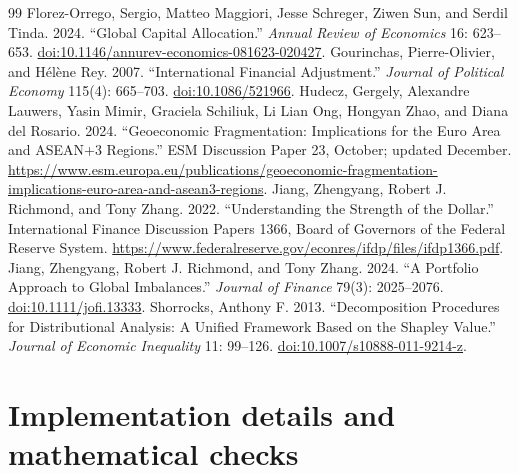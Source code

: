 \documentclass[11pt,a4paper]{article}
\begin{document}
\begin{thebibliography}{99}
 Florez-Orrego, Sergio, Matteo Maggiori, Jesse Schreger, Ziwen Sun, and Serdil Tinda. 2024. ``Global Capital Allocation.'' \textit{Annual Review of Economics} 16: 623--653. \href{https://doi.org/10.1146/annurev-economics-081623-020427}{doi:10.1146/annurev-economics-081623-020427}.
 Gourinchas, Pierre-Olivier, and H\'el\`ene Rey. 2007. ``International Financial Adjustment.'' \textit{Journal of Political Economy} 115(4): 665--703. \href{https://doi.org/10.1086/521966}{doi:10.1086/521966}.
 Hudecz, Gergely, Alexandre Lauwers, Yasin Mimir, Graciela Schiliuk, Li Lian Ong, Hongyan Zhao, and Diana del Rosario. 2024. ``Geoeconomic Fragmentation: Implications for the Euro Area and ASEAN+3 Regions.'' ESM Discussion Paper 23, October; updated December. \url{https://www.esm.europa.eu/publications/geoeconomic-fragmentation-implications-euro-area-and-asean3-regions}.
 Jiang, Zhengyang, Robert J. Richmond, and Tony Zhang. 2022. ``Understanding the Strength of the Dollar.'' International Finance Discussion Papers 1366, Board of Governors of the Federal Reserve System. \url{https://www.federalreserve.gov/econres/ifdp/files/ifdp1366.pdf}.
 Jiang, Zhengyang, Robert J. Richmond, and Tony Zhang. 2024. ``A Portfolio Approach to Global Imbalances.'' \textit{Journal of Finance} 79(3): 2025--2076. \href{https://doi.org/10.1111/jofi.13333}{doi:10.1111/jofi.13333}.
 Shorrocks, Anthony F. 2013. ``Decomposition Procedures for Distributional Analysis: A Unified Framework Based on the Shapley Value.'' \textit{Journal of Economic Inequality} 11: 99--126. \href{https://doi.org/10.1007/s10888-011-9214-z}{doi:10.1007/s10888-011-9214-z}.
\end{thebibliography}

\clearpage\appendix
\section{Implementation details and mathematical checks}\label{app:implementation}
\end{document}
